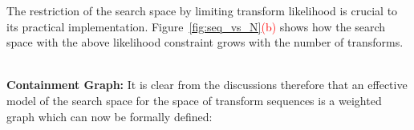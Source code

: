 The restriction of the search space by limiting transform likelihood is crucial to its practical implementation. Figure~\ref{fig:seq_vs_N}\textcolor{red}{(b)} shows how the search space with the above likelihood constraint grows with the number of transforms. 


\noindent\\
{\bf Containment Graph:} It is clear from the discussions therefore that an effective model of the search space for the space of transform sequences is a weighted graph which can now be formally defined: 












